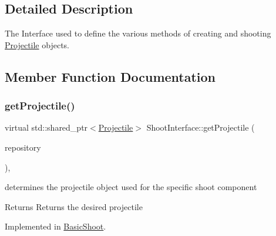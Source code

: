 \subsection{Detailed Description}
The Interface used to define the various methods of creating and shooting \hyperlink{class_projectile}{Projectile} objects. 

\subsection{Member Function Documentation}
\mbox{\label{class_shoot_interface_ab93ccb6b21911e121b19dc15196a4e0b}} 
\subsubsection{\texorpdfstring{get\+Projectile()}{getProjectile()}}
{\footnotesize\ttfamily virtual std\+::shared\+\_\+ptr$<$\hyperlink{class_projectile}{Projectile}$>$ Shoot\+Interface\+::get\+Projectile (\begin{DoxyParamCaption}\item[{const std\+::shared\+\_\+ptr$<$ \hyperlink{class_repositiory_interface}{Repositiory\+Interface} $>$}]{repository }\end{DoxyParamCaption})\hspace{0.3cm}{\ttfamily [protected]}, {}}



determines the projectile object used for the specific shoot component 

\begin{DoxyReturn}{Returns}
Returns the desired projectile 
\end{DoxyReturn}


Implemented in \hyperlink{class_basic_shoot_a2cad5133e2bcdc6441551387b3f2e873}{Basic\+Shoot}.

\mbox{\label{class_shoot_interface_a3e8003c123f8f6c43c12a9afc29356b8}} 
